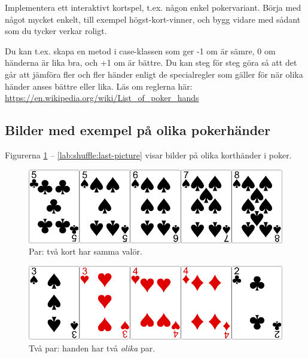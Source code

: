 \Task Implementera ett interaktivt kortspel, t.ex. någon enkel pokervariant. Börja med något mycket enkelt, till exempel högst-kort-vinner, och bygg vidare med sådant som du tycker verkar roligt.

Du kan t.ex. skapa en metod  i case-klassen  som ger -1 om  är sämre, 0 om händerna är lika bra, och +1 om  är bättre. Du kan steg för steg göra så att det går att jämföra fler och fler händer enligt de specialregler som gäller för när olika händer anses bättre eller lika. Läs om reglerna här: \url{https://en.wikipedia.org/wiki/List_of_poker_hands}



\subsection{Bilder med exempel på olika pokerhänder}\label{shuffle:hands}

Figurerna \ref{lab:shuffle:first-picture} -- \ref{lab:shuffle:last-picture} visar bilder på olika korthänder i poker.

\newcommand{\CardWidth}{0.5\textwidth}
\newcommand{\CardCaptionWidth}{0.3\textwidth}

\begin{figure}[H]
 \begin{minipage}[c]{\CardWidth}
  \includegraphics[width=\textwidth]{../img/w05-hands/pair.png}
 \end{minipage}
 \begin{minipage}[c]{\CardCaptionWidth}
  \caption{Par: två kort har samma valör.}
   \label{lab:shuffle:first-picture}
 \end{minipage}
\end{figure}

\begin{figure}[H]
 \begin{minipage}[c]{\CardWidth}
  \includegraphics[width=\textwidth]{../img/w05-hands/twopair.png}
 \end{minipage}
 \begin{minipage}[c]{\CardCaptionWidth}
  \caption{Två par: handen har två \emph{olika} par.}
 \end{minipage}
\end{figure}

